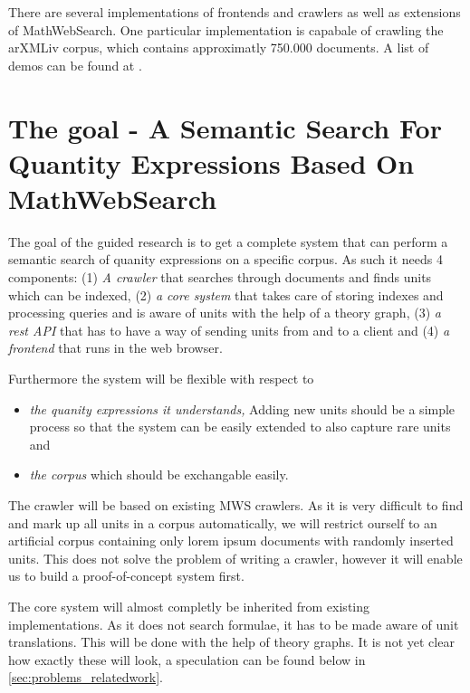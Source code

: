 \documentclass[11pt]{article}
\begin{document}
There are several implementations of frontends and crawlers as well as extensions of MathWebSearch. One particular implementation is capabale of crawling the arXMLiv corpus, which contains approximatly 750.000 documents. A list of demos can be found at \cite{URL:MWSDemo}.

\section{The goal - A Semantic Search For Quantity Expressions Based On MathWebSearch}
\label{sec:extension}

The goal of the guided research is to get a complete system that can perform a semantic search of quanity expressions on a specific corpus.  As such it needs 4 components: (1) \textit{A crawler} that searches through documents and finds units which can be indexed, (2) \textit{a core system} that takes care of storing indexes and processing queries and is aware of units with the help of a theory graph, (3) \textit{a rest API} that has to have a way of sending units from and to a client and (4) \textit{a frontend} that runs in the web browser.

Furthermore the system will be flexible with respect to
\begin{itemize}
  \item \textit{the quanity expressions it understands, } Adding new units should be a simple process so that the system can be easily extended to also capture rare units and
  \item \textit{the corpus} which should be exchangable easily.
\end{itemize}

The crawler will be based on existing MWS crawlers. As it is very difficult to find and mark up all units in a corpus automatically, we will restrict ourself to an artificial corpus containing only lorem ipsum documents with randomly inserted units. This does not solve the problem of writing a crawler, however it will enable us to build a proof-of-concept system first.

The core system will almost completly be inherited from existing implementations. As it does not search formulae, it has to be made aware of unit translations. This will be done with the help of theory graphs. It is not yet clear how exactly these will look, a speculation can be found below in \ref{sec:problems_relatedwork}.
\end{document}
